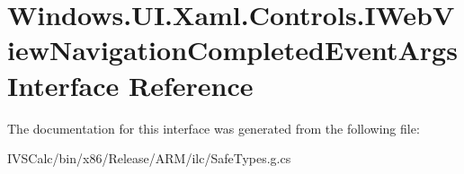 \hypertarget{interface_windows_1_1_u_i_1_1_xaml_1_1_controls_1_1_i_web_view_navigation_completed_event_args}{}\section{Windows.\+U\+I.\+Xaml.\+Controls.\+I\+Web\+View\+Navigation\+Completed\+Event\+Args Interface Reference}
\label{interface_windows_1_1_u_i_1_1_xaml_1_1_controls_1_1_i_web_view_navigation_completed_event_args}


The documentation for this interface was generated from the following file\+:\begin{DoxyCompactItemize}
\item 
I\+V\+S\+Calc/bin/x86/\+Release/\+A\+R\+M/ilc/Safe\+Types.\+g.\+cs\end{DoxyCompactItemize}
